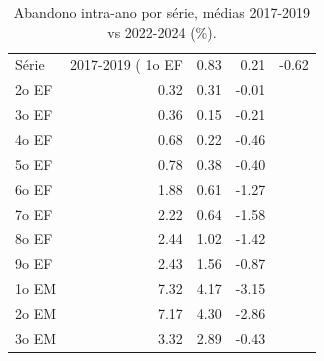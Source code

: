 \begin{table}[htbp]
\centering
\caption{Abandono intra-ano por série, médias 2017-2019 vs 2022-2024 (\%).}
\label{tab:ap_c_abandono}
\small
\begin{tabular}{lrrr}
\toprule
Série & 2017-2019 (%
\midrule
1o EF & 0.83 & 0.21 & -0.62 \\
2o EF & 0.32 & 0.31 & -0.01 \\
3o EF & 0.36 & 0.15 & -0.21 \\
4o EF & 0.68 & 0.22 & -0.46 \\
5o EF & 0.78 & 0.38 & -0.40 \\
6o EF & 1.88 & 0.61 & -1.27 \\
7o EF & 2.22 & 0.64 & -1.58 \\
8o EF & 2.44 & 1.02 & -1.42 \\
9o EF & 2.43 & 1.56 & -0.87 \\
1o EM & 7.32 & 4.17 & -3.15 \\
2o EM & 7.17 & 4.30 & -2.86 \\
3o EM & 3.32 & 2.89 & -0.43 \\
\bottomrule
\end{tabular}
\end{table}
